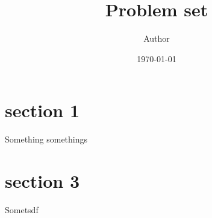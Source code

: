 \documentclass{article}%
\title{Problem set}%
\author{Author}%
\date{\today}%
\begin{document}
%
\normalsize%
\maketitle%
\section{section 1}%
\label{sec:section1}%
Something somethings

%
\section{section 3}%
\label{sec:section3}%
Sometsdf

%
\end{document}
